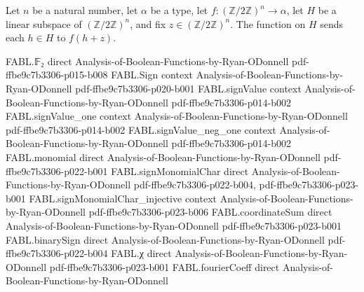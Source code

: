 \begin{definition}
\label{FABL.affineSubspaceRestriction}
\leanok
{}
Let $n$ be a natural number, let $\alpha$ be a type, let
$f:(\mathbb{Z}/2\mathbb{Z})^n\to\alpha$, let $H$ be a linear subspace of
$(\mathbb{Z}/2\mathbb{Z})^n$, and fix $z\in(\mathbb{Z}/2\mathbb{Z})^n$. The function on
$H$ sends each $h\in H$ to $f(h+z)$.
\end{definition}

\begin{theorem}
\label{FABL.affineSubspaceRestriction_apply}
\leanok
{}
\proofstep
  {FABL.𝔽₂}
  {direct}
  {Analysis-of-Boolean-Functions-by-Ryan-ODonnell}
  {pdf-ffbe9c7b3306-p015-b008}
\proofstep
  {FABL.Sign}
  {context}
  {Analysis-of-Boolean-Functions-by-Ryan-ODonnell}
  {pdf-ffbe9c7b3306-p020-b001}
\proofstep
  {FABL.signValue}
  {context}
  {Analysis-of-Boolean-Functions-by-Ryan-ODonnell}
  {pdf-ffbe9c7b3306-p014-b002}
\proofstep
  {FABL.signValue_one}
  {context}
  {Analysis-of-Boolean-Functions-by-Ryan-ODonnell}
  {pdf-ffbe9c7b3306-p014-b002}
\proofstep
  {FABL.signValue_neg_one}
  {context}
  {Analysis-of-Boolean-Functions-by-Ryan-ODonnell}
  {pdf-ffbe9c7b3306-p014-b002}
\proofstep
  {FABL.monomial}
  {direct}
  {Analysis-of-Boolean-Functions-by-Ryan-ODonnell}
  {pdf-ffbe9c7b3306-p022-b001}
\proofstep
  {FABL.signMonomialChar}
  {direct}
  {Analysis-of-Boolean-Functions-by-Ryan-ODonnell}
  {pdf-ffbe9c7b3306-p022-b004,
    pdf-ffbe9c7b3306-p023-b001}
\proofstep
  {FABL.signMonomialChar_injective}
  {context}
  {Analysis-of-Boolean-Functions-by-Ryan-ODonnell}
  {pdf-ffbe9c7b3306-p023-b006}
\proofstep
  {FABL.coordinateSum}
  {direct}
  {Analysis-of-Boolean-Functions-by-Ryan-ODonnell}
  {pdf-ffbe9c7b3306-p023-b001}
\proofstep
  {FABL.binarySign}
  {direct}
  {Analysis-of-Boolean-Functions-by-Ryan-ODonnell}
  {pdf-ffbe9c7b3306-p022-b004}
\proofstep
  {FABL.χ}
  {direct}
  {Analysis-of-Boolean-Functions-by-Ryan-ODonnell}
  {pdf-ffbe9c7b3306-p023-b001}
\proofstep
  {FABL.fourierCoeff}
  {direct}
  {Analysis-of-Boolean-Functions-by-Ryan-ODonnell}

\end{theorem}
